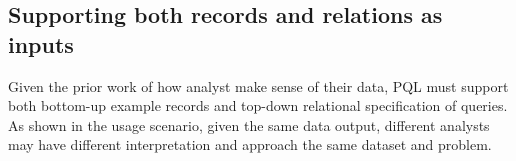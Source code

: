 \documentclass{sig-alternate-05-2015}
\begin{document}
\subsection{Supporting both records and relations as inputs} Given the prior work of how analyst make sense of their data\cite{Pirolli2005,Klein2006}, PQL must support both bottom-up example records and top-down relational specification of queries. As shown in the usage scenario, given the same data output, different analysts may have different interpretation and approach the same dataset and problem. %
\end{document}
